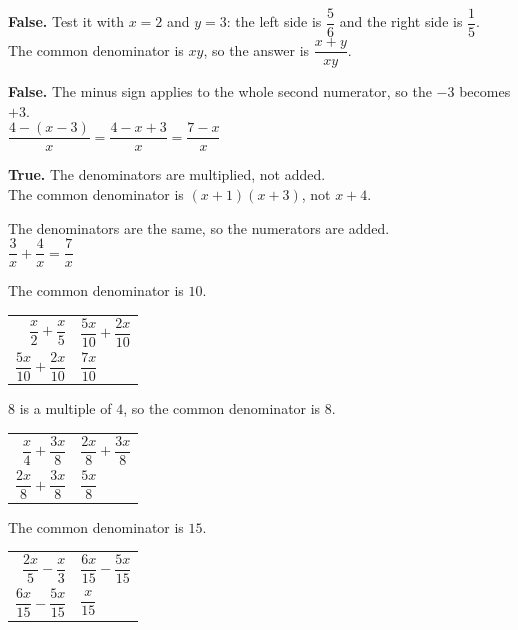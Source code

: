 \documentclass[aspectratio=169]{beamer}
\makeatletter
\newcommand{\work}[1]{%
  \begin{tabular}{@{}r@{\;=\;}l@{}}#1\end{tabular}%
}
\makeatother
\begin{document}
  {\textbf{False.} Test it with $x=2$ and $y=3$: the left side is
   $\dfrac{5}{6}$ and the right side is $\dfrac{1}{5}$.\\[0.3em]
   The common denominator is $xy$, so the answer is $\dfrac{x+y}{xy}$.}

  {\textbf{False.} The minus sign applies to the whole second numerator,
   so the $-3$ becomes $+3$.\\[0.3em]
   $\dfrac{4-(x-3)}{x}=\dfrac{4-x+3}{x}=\dfrac{7-x}{x}$}

  {\textbf{True.} The denominators are multiplied, not added.\\[0.3em]
   The common denominator is $(x+1)(x+3)$, not $x+4$.}

  {The denominators are the same, so the numerators are added.\\[0.4em]
   $\dfrac{3}{x}+\dfrac{4}{x}=\dfrac{7}{x}$}

  {The common denominator is $10$.
   \par\vspace{0.4em}
   \work{$\dfrac{x}{2}+\dfrac{x}{5}$ & $\dfrac{5x}{10}+\dfrac{2x}{10}$\\[0.95em]
         $\dfrac{5x}{10}+\dfrac{2x}{10}$ & $\dfrac{7x}{10}$}}

  {$8$ is a multiple of $4$, so the common denominator is $8$.
   \par\vspace{0.4em}
   \work{$\dfrac{x}{4}+\dfrac{3x}{8}$ & $\dfrac{2x}{8}+\dfrac{3x}{8}$\\[0.95em]
         $\dfrac{2x}{8}+\dfrac{3x}{8}$ & $\dfrac{5x}{8}$}}

  {The common denominator is $15$.
   \par\vspace{0.4em}
   \work{$\dfrac{2x}{5}-\dfrac{x}{3}$ & $\dfrac{6x}{15}-\dfrac{5x}{15}$\\[0.95em]
         $\dfrac{6x}{15}-\dfrac{5x}{15}$ & $\dfrac{x}{15}$}}
\end{document}
